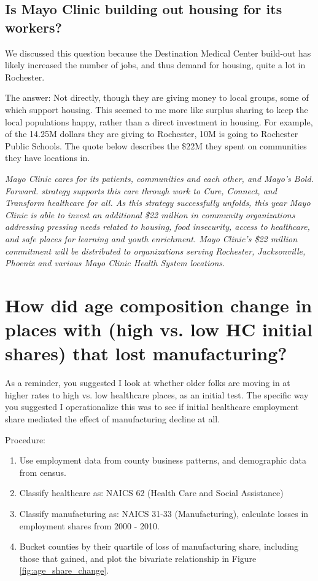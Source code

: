 \documentclass[11pt]{article}
\begin{document}
\subsection*{Is Mayo Clinic building out housing for its workers?}
We discussed this question because the Destination Medical Center build-out has likely increased the number of jobs, and thus demand for housing, quite a lot in Rochester. 

The answer: Not directly, though they are giving money to local groups, some of which support housing. This seemed to me more like surplus sharing to keep the local populations happy, rather than a direct investment in housing. For example, of the 14.25M dollars they are giving to Rochester, 10M is going to Rochester Public Schools.  The quote below describes the \$22M they spent on communities they have locations in.


\textit{
Mayo Clinic cares for its patients, communities and each other, and Mayo’s Bold. Forward. strategy supports this care through work to Cure, Connect, and Transform healthcare for all. As this strategy successfully unfolds, this year Mayo Clinic is able to invest an additional \$22 million in community organizations addressing pressing needs related to housing, food insecurity, access to healthcare, and safe places for learning and youth enrichment. Mayo Clinic's \$22 million commitment will be distributed to organizations serving Rochester, Jacksonville, Phoenix and various Mayo Clinic Health System locations. }


\section{How did age composition change in places with (high vs. low HC initial shares) that lost manufacturing? }

As a reminder, you suggested I look at whether older folks are moving in at higher rates to high vs. low healthcare places, as an initial test. The specific way you suggested I operationalize this was to see if initial healthcare employment share mediated the effect of manufacturing decline at all. 

Procedure:
\begin{enumerate}
\item Use employment data from county business patterns, and demographic data from census. 

\item Classify  healthcare as: NAICS 62 (Health Care and Social Assistance)
\item Classify manufacturing as:  NAICS 31-33 (Manufacturing),    calculate losses in employment shares from 2000 - 2010.
\item Bucket counties by their quartile of loss of manufacturing share, including those that gained, and plot the bivariate relationship in Figure \ref{fig:age_share_change}.
\end{enumerate}
\end{document}

